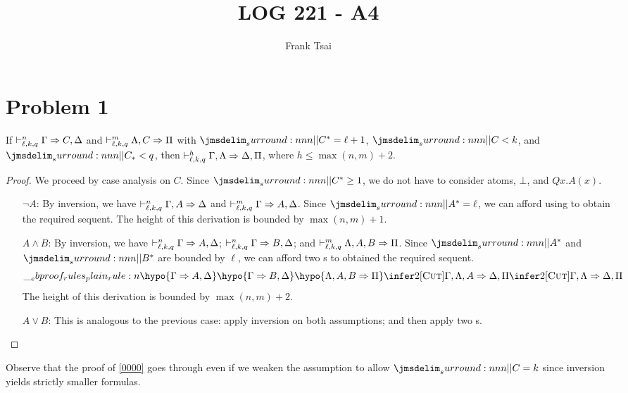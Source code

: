 \documentclass[a4paper]{article}
\title{LOG 221 - A4}
\author{Frank Tsai}
\begin{document}
\maketitle

\section*{Problem 1}\label{0001}

\begin{lemma}\label{0000}
  If $\mathrel{\vdash^{n}_{\ell,k,q}} \Gamma \Rightarrow C,\Delta$ and $\mathrel{\vdash^{m}_{\ell,k,q}} \Lambda,C \Rightarrow \Pi$ with $\dRank{C} = \ell + 1$, $\cRank{C} < k$, and $\qRank{C} < q$, then $\mathrel{\vdash^{h}_{\ell,k,q}} \Gamma,\Lambda \Rightarrow \Delta,\Pi$, where $h \leq \max(n,m) + 2$.
\end{lemma}
\begin{proof}
  We proceed by case analysis on $C$.
  Since $\dRank{C} \geq 1$, we do not have to consider atoms, $\bot$, and $Qx.A(x)$.
  \begin{itemize}
  \item[$\lnot A$:] By inversion, we have $\mathrel{\vdash^{n}_{\ell,k,q}} \Gamma,A \Rightarrow \Delta$ and $\mathrel{\vdash^{m}_{\ell,k,q}} \Gamma \Rightarrow A, \Delta$.
    Since $\dRank{A} = \ell$, we can afford using \rCut{} to obtain the required sequent.
    The height of this derivation is bounded by $\max(n,m) + 1$.
  \item[$A \wedge B$:] By inversion, we have $\mathrel{\vdash^{n}_{\ell,k,q}} \Gamma \Rightarrow A,\Delta$; $\mathrel{\vdash^{n}_{\ell,k,q}} \Gamma \Rightarrow B,\Delta$; and $\mathrel{\vdash^{m}_{\ell,k,q}} \Lambda,A,B \Rightarrow \Pi$.
    Since $\dRank{A}$ and $\dRank{B}$ are bounded by $\ell$, we can afford two \rCut{}s to obtained the required sequent.
    \[
      \ebrule{
        \hypo{\Gamma \Rightarrow A,\Delta}
        \hypo{\Gamma \Rightarrow B,\Delta}
        \hypo{\Lambda,A,B \Rightarrow \Pi}
        \infer2[\rCut]{\Gamma,\Lambda,A \Rightarrow \Delta,\Pi}
        \infer2[\rCut]{\Gamma,\Lambda \Rightarrow \Delta,\Pi}
      }
    \]
    The height of this derivation is bounded by $\max(n,m) + 2$.
  \item[$A \vee B$:] This is analogous to the previous case: apply inversion on both assumptions; and then apply two \rCut{}s.
  \end{itemize}
\end{proof}

Observe that the proof of \cref{0000} goes through even if we weaken the assumption to allow $\cRank{C} = k$ since inversion yields strictly smaller formulas.
\end{document}
